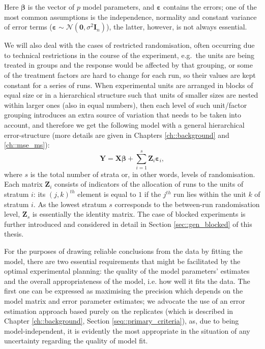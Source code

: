 Here $\bm{\beta}$ is the vector of $p$ model parameters, and $\bm{\varepsilon}$ contains the errors; one of the most common assumptions is the independence, normality and constant variance of error terms ($\bm{\varepsilon}  \sim \mathcal{N}(\bm{0},\sigma^{2}\bm{I}_{n})$), the latter, however, is not always essential.

We will also deal with the cases of restricted randomisation, often occurring due to technical restrictions in the course of the experiment, e.g.~the units are being treated in groups and the response would be affected by that grouping, or some of the treatment factors are hard to change for each run, so their values are kept constant for a series of runs. When experimental units are arranged in blocks of equal size or in a hierarchical structure such that units of smaller sizes are nested within larger ones (also in equal numbers), then each level of such unit/factor grouping introduces an extra source of variation that needs to be taken into account, and therefore we get the following model with a general hierarchical error-structure (more details are given in Chapters \ref{ch::background} and \ref{ch::mse_ms}):
\begin{equation}
\label{eq::intro_ms}
\bm{Y}=\bm{X}\bm{\beta}+\sum_{i=1}^{s}\bm{Z}_{i}\bm{\varepsilon}_{i},
\end{equation}
where $s$ is the total number of strata or, in other words, levels of randomisation. Each matrix $\bm{Z}_{i}$ consists of indicators of the allocation of runs to the units of stratum $i$: its $(j,k)^{th}$ element is equal to $1$ if the $j^{th}$ run lies within the unit $k$ of stratum $i$. As the lowest stratum $s$ corresponds to the between-run randomisation level, $\bm{Z}_{s}$ is essentially the identity matrix. The case of blocked experiments is further introduced and considered in detail in Section \ref{sec::gen_blocked} of this thesis.	

For the purposes of drawing reliable conclusions from the data by fitting the model, there are two essential requirements that might be facilitated by the optimal experimental planning: the quality of the model parameters' estimates and the overall appropriateness of the model, i.e. how well it fits the data. The first one can be expressed as maximising the precision which depends on the model matrix and error parameter estimates; we advocate the use of an error estimation approach based purely on the replicates (which is described in Chapter \ref{ch::background}, Section \ref{seq::primary_criteria}), as, due to being model-independent, it is evidently the most appropriate in the situation of any uncertainty regarding the quality of model fit. 

